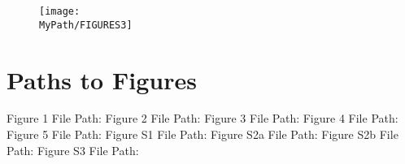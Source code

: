 \documentclass[12pt]{article}
\newcommand*{\MyPath}{..}
\begin{document}
\begin{figure}
  \texttt{[image: \\MyPath/FIGURES3]}
  \caption{}
  \label{fig:figS3}
\end{figure}

\clearpage
\section{Paths to Figures}
Figure 1 File Path: {\tiny\texttt{}}
Figure 2 File Path: {\tiny\texttt{}}
Figure 3 File Path: {\tiny\texttt{}}
Figure 4 File Path: {\tiny\texttt{}}
Figure 5 File Path: {\tiny\texttt{}}
Figure S1 File Path: {\tiny\texttt{}}
Figure S2a File Path: {\tiny\texttt{}}
Figure S2b File Path: {\tiny\texttt{}}
Figure S3 File Path: {\tiny\texttt{}}
\end{document}
